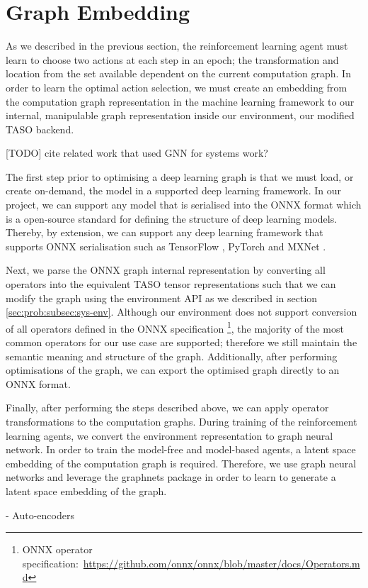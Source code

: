 \section{Graph Embedding}

As we described in the previous section, the reinforcement learning agent must learn to choose two actions at each step in an epoch; the transformation and location from the set available dependent on the current computation graph. In order to learn the optimal action selection, we must create an embedding from the computation graph representation in the machine learning framework to our internal, manipulable graph representation inside our environment, our modified TASO backend.

[TODO] cite related work that used GNN for systems work?

The first step prior to optimising a deep learning graph is that we must load, or create on-demand, the model in a supported deep learning framework. In our project, we can support any model that is serialised into the ONNX \cite{bai2019onnx} format which is a open-source standard for defining the structure of deep learning models. Thereby, by extension, we can support any deep learning framework that supports ONNX serialisation such as TensorFlow \cite{tensorflow2015-whitepaper}, PyTorch \cite{pytorch} and MXNet \cite{chen2015mxnet}.

Next, we parse the ONNX graph internal representation by converting all operators into the equivalent TASO tensor representations such that we can modify the graph using the environment API as we described in section \ref{sec:prob:subsec:sys-env}. Although our environment does not support conversion of all operators defined in the ONNX specification \footnote{ONNX operator specification:~\url{https://github.com/onnx/onnx/blob/master/docs/Operators.md}}, the majority of the most common operators for our use case are supported; therefore we still maintain the semantic meaning and structure of the graph. Additionally, after performing optimisations of the graph, we can export the optimised graph directly to an ONNX format.

Finally, after performing the steps described above, we can apply operator transformations to the computation graphs. During training of the reinforcement learning agents, we convert the environment representation to graph neural network. In order to train the model-free and model-based agents, a latent space embedding of the computation graph is required. Therefore, we use graph neural networks and leverage the graph\textunderscore nets package in order to learn to generate a latent space embedding of the graph.

- Auto-encoders
